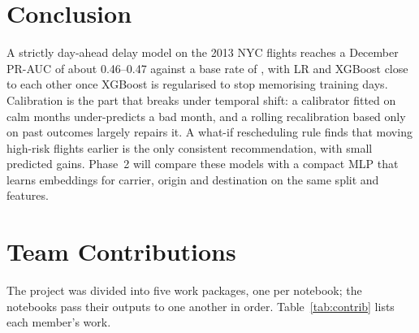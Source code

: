 \documentclass[conference]{IEEEtran}
\begin{document}
\section{Conclusion}
A strictly day-ahead delay model on the 2013 NYC flights reaches a December PR-AUC of
about 0.46--0.47 against a base rate of \TestRate, with LR and XGBoost close to each
other once XGBoost is regularised to stop memorising training days. Calibration is the
part that breaks under temporal shift: a calibrator fitted on calm months
under-predicts a bad month, and a rolling recalibration based only on past outcomes
largely repairs it. A what-if rescheduling rule finds that moving high-risk flights
earlier is the only consistent recommendation, with small predicted gains. Phase~2
will compare these models with a compact MLP that learns embeddings for carrier,
origin and destination on the same split and features.

\section*{Team Contributions}
The project was divided into five work packages, one per notebook; the notebooks pass
their outputs to one another in order. Table~\ref{tab:contrib} lists each member's work.




\end{document}

